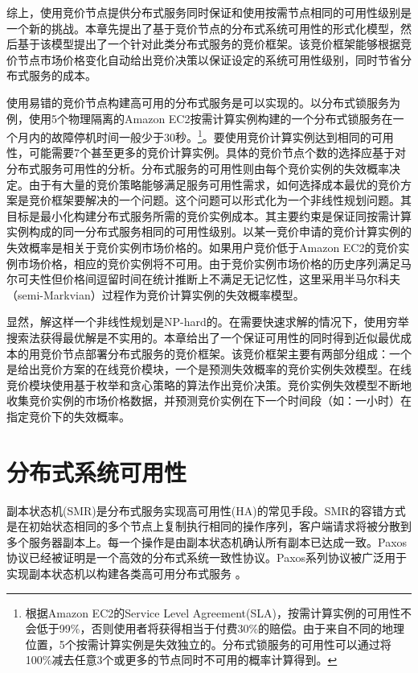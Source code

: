 综上，使用竞价节点提供分布式服务同时保证和使用按需节点相同的可用性级别是一个新的挑战。本章先提出了基于竞价节点的分布式系统可用性的形式化模型，然后基于该模型提出了一个针对此类分布式服务的竞价框架。该竞价框架能够根据竞价节点市场价格变化自动给出竞价决策以保证设定的系统可用性级别，同时节省分布式服务的成本。

使用易错的竞价节点构建高可用的分布式服务是可以实现的。以分布式锁服务为例，使用5个物理隔离的Amazon EC2按需计算实例构建的一个分布式锁服务在一个月内的故障停机时间一般少于30秒。\footnote{根据Amazon EC2的Service Level Agreement(SLA)，按需计算实例的可用性不会低于99\%，否则使用者将获得相当于付费30\%的赔偿。由于来自不同的地理位置，5个按需计算实例是失效独立的。分布式锁服务的可用性可以通过将100\%减去任意3个或更多的节点同时不可用的概率计算得到。}。要使用竞价计算实例达到相同的可用性，可能需要7个甚至更多的竞价计算实例。具体的竞价节点个数的选择应基于对分布式服务可用性的分析。分布式服务的可用性则由每个竞价实例的失效概率决定。由于有大量的竞价策略能够满足服务可用性需求，如何选择成本最优的竞价方案是竞价框架要解决的一个问题。这个问题可以形式化为一个非线性规划问题。其目标是最小化构建分布式服务所需的竞价实例成本。其主要约束是保证同按需计算实例构成的同一分布式服务相同的可用性级别。以某一竞价申请的竞价计算实例的失效概率是相关于竞价实例市场价格的。如果用户竞价低于Amazon EC2的竞价实例市场价格，相应的竞价实例将不可用。由于竞价实例市场价格的历史序列满足马尔可夫性但价格间逗留时间在统计推断上不满足无记忆性，这里采用半马尔科夫（semi-Markvian）过程作为竞价计算实例的失效概率模型。

显然，解这样一个非线性规划是NP-hard的。在需要快速求解的情况下，使用穷举搜索法获得最优解是不实用的。本章给出了一个保证可用性的同时得到近似最优成本的用竞价节点部署分布式服务的竞价框架。该竞价框架主要有两部分组成：一个是给出竞价方案的在线竞价模块，一个是预测失效概率的竞价实例失效模型。在线竞价模块使用基于枚举和贪心策略的算法作出竞价决策。竞价实例失效模型不断地收集竞价实例的市场价格数据，并预测竞价实例在下一个时间段（如：一小时）在指定竞价下的失效概率。

\section{分布式系统可用性}
\label{sec:jupiter_dist_basis}
副本状态机(SMR)是分布式服务实现高可用性(HA)的常见手段。SMR的容错方式是在初始状态相同的多个节点上复制执行相同的操作序列，客户端请求将被分散到多个服务器副本上。每一个操作是由副本状态机确认所有副本已达成一致。Paxos \cite{lamport2001paxos}协议已经被证明是一个高效的分布式系统一致性协议。Paxos系列协议被广泛用于实现副本状态机以构建各类高可用分布式服务 \cite{Bolosky:2011:PRS:1972457.1972472, Burrows:2006:CLS:1298455.1298487, Mu:2014:PME:2600212.2600218}。

